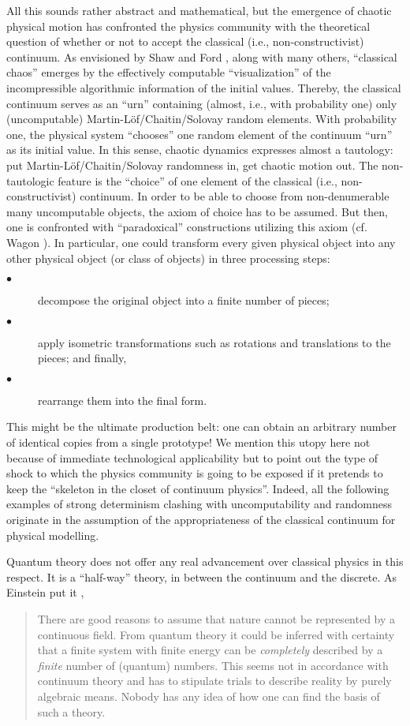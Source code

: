All this sounds rather abstract and mathematical, but the emergence of
chaotic physical
motion has confronted the physics community with the theoretical question of
 whether or not to accept the classical
(i.e., non-constructivist) continuum.
As envisioned by  Shaw \cite{shaw} and Ford \cite{ford}, along with
many others, ``classical chaos'' emerges by the effectively
computable ``visualization'' of the incompressible algorithmic
information of the initial values. Thereby, the classical continuum
serves as an ``urn'' containing (almost, i.e., with probability one)
only (uncomputable)  Martin-L\"of/Chaitin/Solovay random elements.
With probability one, the physical system ``chooses'' one random
element of the continuum
``urn'' as its initial value.
In this sense, chaotic dynamics expresses almost a tautology:
put Martin-L\"of/Chaitin/Solovay
 randomness in, get chaotic motion out.
The non-tautologic feature is the ``choice'' of one
element of the classical (i.e., non-constructivist) continuum.
In order to be able to choose from non-denumerable many uncomputable
objects, the axiom of choice has to be assumed. But then, one is
confronted with ``paradoxical'' constructions utilizing this axiom
(cf.  Wagon
\cite{wagon,svozil}).
 In particular, one could transform every given physical
object into any other physical object (or class of objects) in three
processing steps:
\begin{description}
\item[$\bullet$]
decompose the original object into a finite number of pieces;
\item[$\bullet$]
apply isometric transformations such as rotations
and translations to the pieces; and finally,
\item[$\bullet$]
rearrange them into the final form.
\end{description}
This might  be the ultimate production belt: one can obtain an arbitrary
number of
identical copies from a single prototype!
We mention this utopy here not because of immediate technological
applicability but  to point out the type of shock
to which the physics community is going to be exposed
if it pretends to keep
the
``skeleton in the closet of continuum physics''.
Indeed, all the following examples of strong
determinism clashing with uncomputability and randomness originate in
the assumption of the appropriateness of the classical continuum for
physical modelling.

Quantum theory does not offer any real advancement over classical physics
in this
respect. It is a  ``half-way'' theory, in between the continuum and the
discrete.
 As Einstein put it \cite{ein1},
\begin{quote}
 There are good reasons to assume that nature
cannot be represented by a continuous field.   From quantum theory it could be
inferred with certainty that a finite
system with finite energy can be {\em completely} described by a {\em
finite} number of (quantum) numbers.
This seems not in accordance with continuum theory and has to stipulate
trials to describe reality by purely algebraic means.
Nobody has any idea of how one can find the basis of such a
theory.
\end{quote}


